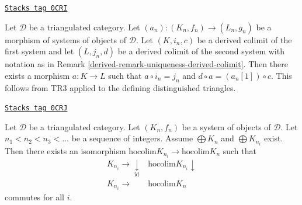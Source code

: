 \begin{remark}
\label{derived-remark-functoriality-derived-colimit}
\href{https://stacks.math.columbia.edu/tag/0CRI}{\texttt{Stacks tag 0CRI}}

Let $\mathcal{D}$ be a triangulated category.
Let $(a_n) : (K_n, f_n) \to (L_n, g_n)$ be a morphism of systems
of objects of $\mathcal{D}$. Let $(K, i_n, c)$ be a derived
colimit of the first system and let $(L, j_n, d)$ be a derived
colimit of the second system with notation as in
Remark \ref{derived-remark-uniqueness-derived-colimit}.
Then there exists a morphism $a : K \to L$
such that $a \circ i_n = j_n$ and $d \circ a = (a_n[1]) \circ c$.
This follows from TR3 applied to the defining distinguished
triangles.
\end{remark}

\begin{lemma}
\label{derived-lemma-hocolim-subsequence}
\href{https://stacks.math.columbia.edu/tag/0CRJ}{\texttt{Stacks tag 0CRJ}}

Let $\mathcal{D}$ be a triangulated category.
Let $(K_n, f_n)$ be a system of objects of $\mathcal{D}$.
Let $n_1 < n_2 < n_3 < \ldots$ be a sequence of integers.
Assume $\bigoplus K_n$ and $\bigoplus K_{n_i}$ exist.
Then there exists an isomorphism
$\text{hocolim} K_{n_i} \to \text{hocolim} K_n$
such that
$$
\begin{array}{cc}K_{n_i} \longrightarrow\underset{\text{id}}{\downarrow} & \text{hocolim} K_{n_i} \downarrow \\ K_{n_i} \longrightarrow & \text{hocolim} K_n\end{array}
$$
commutes for all $i$.
\end{lemma}

